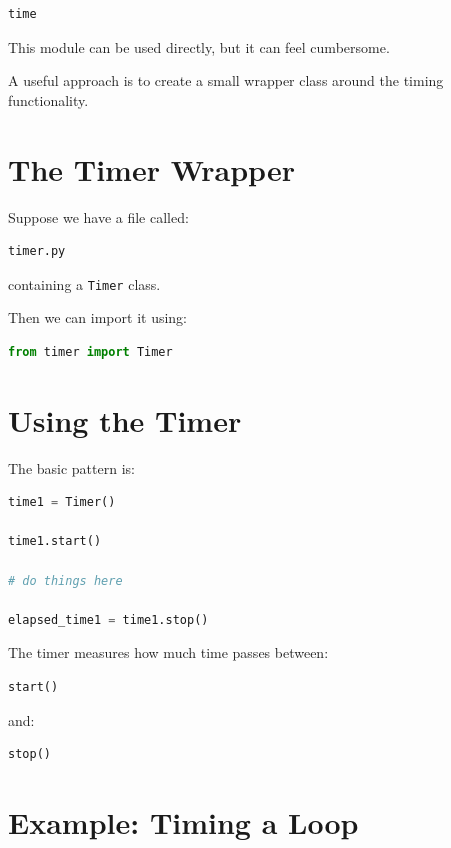 \documentclass[11pt]{article}
\begin{document}
\begin{lstlisting}[language=Python]
time
\end{lstlisting}

This module can be used directly, but it can feel cumbersome.

A useful approach is to create a small wrapper class around the timing functionality.

\section{The Timer Wrapper}

Suppose we have a file called:

\begin{lstlisting}
timer.py
\end{lstlisting}

containing a \texttt{Timer} class.

Then we can import it using:

\begin{lstlisting}[language=Python]
from timer import Timer
\end{lstlisting}

\section{Using the Timer}

The basic pattern is:

\begin{lstlisting}[language=Python]
time1 = Timer()

time1.start()

# do things here

elapsed_time1 = time1.stop()
\end{lstlisting}

The timer measures how much time passes between:

\begin{lstlisting}[language=Python]
start()
\end{lstlisting}

and:

\begin{lstlisting}[language=Python]
stop()
\end{lstlisting}

\section{Example: Timing a Loop}
\end{document}
